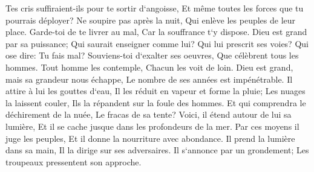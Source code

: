 \verse Tes cris suffiraient-ils pour te sortir d`angoisse, Et même toutes les forces que tu pourrais déployer? 
\verse Ne soupire pas après la nuit, Qui enlève les peuples de leur place. 
\verse Garde-toi de te livrer au mal, Car la souffrance t`y dispose. 
\verse Dieu est grand par sa puissance; Qui saurait enseigner comme lui? 
\verse Qui lui prescrit ses voies? Qui ose dire: Tu fais mal? 
\verse Souviens-toi d`exalter ses oeuvres, Que célèbrent tous les hommes. 
\verse Tout homme les contemple, Chacun les voit de loin. 
\verse Dieu est grand, mais sa grandeur nous échappe, Le nombre de ses années est impénétrable. 
\verse Il attire à lui les gouttes d`eau, Il les réduit en vapeur et forme la pluie; 
\verse Les nuages la laissent couler, Ils la répandent sur la foule des hommes. 
\verse Et qui comprendra le déchirement de la nuée, Le fracas de sa tente? 
\verse Voici, il étend autour de lui sa lumière, Et il se cache jusque dans les profondeurs de la mer. 
\verse Par ces moyens il juge les peuples, Et il donne la nourriture avec abondance. 
\verse Il prend la lumière dans sa main, Il la dirige sur ses adversaires. 
\verse Il s`annonce par un grondement; Les troupeaux pressentent son approche. 

